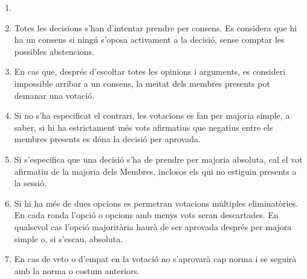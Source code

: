 \documentclass[12pt]{article}
\begin{document}
\begin{art}
    \begin{enumerate}[1.]
        \item[]
        \item Totes les decisions s'han d'intentar prendre per consens. Es considera que hi ha un consens si ningú s'oposa activament a la decisió, sense comptar les possibles abstencions.
        \item En cas que, després d'escoltar totes les opinions i arguments, es consideri impossible arribar a un consens, la meitat dels membres presents pot demanar una votació.
        \item Si no s'ha especificat el contrari, les votacions es fan per majoria simple, a saber, si hi ha estrictament més vots afirmatius que negatius entre els membres presents es dóna la decisió per aprovada.
        \item Si s'especifica que una decisió s'ha de prendre per majoria absoluta, cal el vot afirmatiu de la majoria dels Membres, inclosos els qui no estiguin presents a la sessió.
        \item Si hi ha més de dues opcions es permetran votacions múltiples eliminatòries. En cada ronda l'opció o opcions amb menys vots seran descartades. En qualsevol cas l'opció majoritària haurà de ser aprovada després per majora simple o, si s'escau, absoluta.
        \item En cas de veto o d'empat en la votació no s'aprovarà cap norma i se seguirà amb la norma o costum anteriors.
    \end{enumerate}
\end{art}
\end{document}
